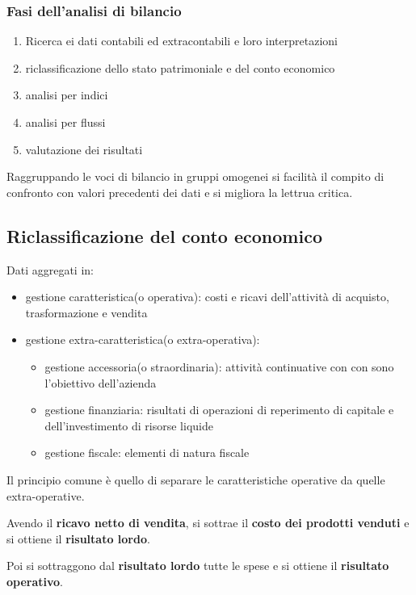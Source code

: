 \subsubsection{Fasi dell'analisi di bilancio}
\begin{enumerate}
    \item Ricerca ei dati contabili ed extracontabili e loro interpretazioni
    \item riclassificazione dello stato patrimoniale e del conto economico
    \item analisi per indici
    \item analisi per flussi
    \item valutazione dei risultati
\end{enumerate}

Raggruppando le voci di bilancio in gruppi omogenei si facilità il compito di confronto con valori precedenti dei dati e si migliora la lettrua critica.


\subsection{Riclassificazione del conto economico}
Dati aggregati in:
\begin{itemize}
    \item gestione caratteristica(o operativa): costi e ricavi dell'attività di acquisto, trasformazione e vendita
    \item gestione extra-caratteristica(o extra-operativa): 
        \begin{itemize}
            \item gestione accessoria(o straordinaria): attività continuative con con sono l'obiettivo dell'azienda
            \item gestione finanziaria: risultati di operazioni di reperimento di capitale e dell'investimento di risorse liquide
            \item gestione fiscale: elementi di natura fiscale
        \end{itemize}
\end{itemize}

Il principio comune è quello di separare le caratteristiche operative da quelle extra-operative.


Avendo il \textbf{ricavo netto di vendita}, si sottrae il \textbf{costo dei prodotti venduti} e si ottiene 
il \textbf{risultato lordo}.

Poi si sottraggono dal \textbf{risultato lordo} tutte le spese e si ottiene il \textbf{risultato operativo}.

